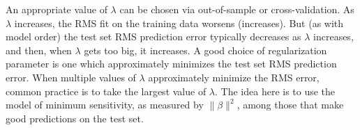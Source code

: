 An appropriate value of \(\lambda\) can be chosen via out-of-sample or cross-validation. As \(\lambda\) increases, the RMS fit on the training data worsens (increases). But (as with model order) the test set RMS prediction error typically decreases as \(\lambda\) increases, and then, when \(\lambda\) gets too big, it increases. A good choice of regularization parameter is one which approximately minimizes the test set RMS prediction error. When multiple values of \(\lambda\) approximately minimize the RMS error, common practice is to take the largest value of \(\lambda\). The idea here is to use the model of minimum sensitivity, as measured by \(\|\beta\|^{2}\), among those that make good predictions on the test set.

 